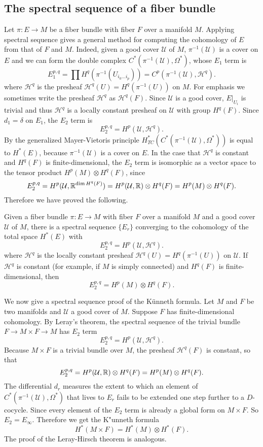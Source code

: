 \subsection{The spectral sequence of a fiber bundle}
Let $\pi:E\to M$ be a fiber bundle with fiber $F$ over a manifold $M$. Applying spectral sequence gives a general method for computing the cohomology of $E$ from that 
of $F$ and $M$. Indeed, given a good cover $\mathcal{U}$ of $M$, $\pi^{-1}(\mathcal{U})$ is a cover on $E$ and we can form the double complex 
$C^*(\pi^{-1}(\mathcal{U}),\Omega^*)$, whose $E_1$ term is
\[E_1^{p,q}=\prod H^q(\pi^{-1}(U_{i_0\dots i_p}))=C^p(\pi^{-1}(\mathcal{U}),\mathscr{H}^q).\]
where $\mathscr{H}^q$ is the presheaf $\mathscr{H}^q(U)=H^q(\pi^{-1}(U))$ on $M$. For emphasis we sometimes write the presheaf $\mathscr{H}^q$ as $\mathscr{H}^q(F)$. 
Since $\mathcal{U}$ is a good cover, $E|_{U_i}$ is trivial and thus $\mathscr{H}^q$ is a locally constant presheaf on $\mathcal{U}$ with group $H^q(F)$. Since $d_1=\delta$ 
on $E_1$, the $E_2$ term is
\[E_2^{p,q}=H^p(\mathcal{U},\mathscr{H}^q).\]
By the generalized Mayer-Vietoris principle $H^*_{TC}(C^*(\pi^{-1}(\mathcal{U}),\Omega^*))$ is equal to $H^*(E)$, because $\pi^{-1}(\mathcal{U})$ is a cover on $E$. 
In the case that $\mathscr{H}^q$ is constant and $H^q(F)$ is finite-dimensional, the $E_2$ term is isomorphic as a vector space to the tensor product $H^p(M)\otimes H^q(F)$, 
since
\[E_2^{p,q}=H^p(\mathcal{U},\mathbb{R}^{\dim H^q(F)})=H^p(\mathcal{U},\mathbb{R})\otimes H^q(F)=H^p(M)\otimes H^q(F).\]
Therefore we have proved the following.
\begin{proposition}
Given a fiber bundle $\pi:E\to M$ with fiber $F$ over a manifold $M$ and a good cover $\mathcal{U}$ of $M$, there is a spectral sequence $\{E_r\}$ converging to the 
cohomology of the total space $H^*(E)$ with
\[E_2^{p,q}=H^p(\mathcal{U},\mathscr{H}^q).\]
where $\mathscr{H}^q$ is the locally constant presheaf $\mathscr{H}^q(U)=H^q(\pi^{-1}(U))$ on $\mathcal{U}$. If $\mathscr{H}^q$ is constant (for example, if $M$ is 
simply connected) and $H^q(F)$ is finite-dimensional, then
\[E_2^{p,q}=H^p(M)\otimes H^q(F).\]
\end{proposition}
\begin{example}
We now give a spectral sequence proof of the K\"unneth formula. Let $M$ and $F$ be two manifolds and $\mathcal{U}$ a good cover of $M$. Suppose $F$ has 
finite-dimensional cohomology. By Leray's theorem, the spectral sequence of the trivial bundle $F\to M\times F\to M$ has $E_2$ term
\[E_2^{p,q}=H^p(\mathcal{U},\mathscr{H}^q).\]
Because $M\times F$ is a trivial bundle over $M$, the presheaf $\mathscr{H}^q(F)$ is constant, so that
\[E_2^{p,q}=H^p(\mathcal{U},\mathbb{R})\otimes H^q(F)=H^p(M)\otimes H^q(F).\]
The differential $d_r$ measures the extent to which an element of $C^*(\pi^{-1}(\mathcal{U}),\Omega^*)$ that lives to $E_r$ fails to be extended one step further to a 
$D$-cocycle. Since every element of the $E_2$ term is already a global form on $M\times F$. So $E_2=E_{\infty}$. Therefore we get the K"unneth formula
\[H^*(M\times F)=H^*(M)\otimes H^*(F).\]
The proof of the Leray-Hirsch theorem is analogous.
\end{example}
